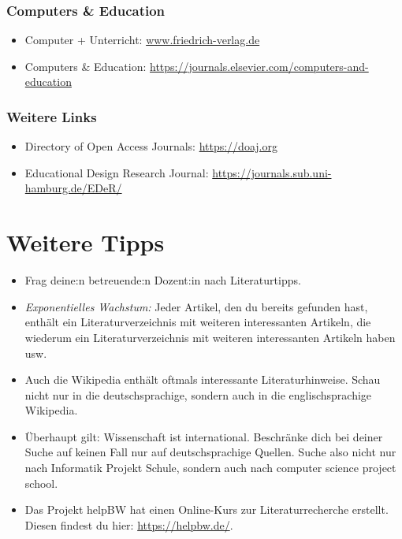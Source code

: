 \documentclass{../cssheet}
\begin{document}
\subsubsection*{Computers \& Education}
\begin{itemize}
\item Computer + Unterricht: \href{https://www.friedrich-verlag.de/shop/schule-und-unterricht/digitale-schule/fachzeitschriften/computer-unterricht}{www.friedrich-verlag.de}
\item Computers \& Education: \url{https://journals.elsevier.com/computers-and-education}
\end{itemize}

\subsubsection*{Weitere Links}
\begin{itemize}
\item Directory of Open Access Journals: \url{https://doaj.org}
\item Educational Design Research Journal: \url{https://journals.sub.uni-hamburg.de/EDeR/}
\end{itemize}

\section{Weitere Tipps}
\begin{itemize}
\item Frag deine:n betreuende:n Dozent:in nach Literaturtipps.
\item \emph{Exponentielles Wachstum:} Jeder Artikel, den du bereits gefunden hast, enthält ein Literaturverzeichnis mit weiteren interessanten Artikeln, die wiederum ein Literaturverzeichnis mit weiteren interessanten Artikeln haben usw.
\item Auch die Wikipedia enthält oftmals interessante Literaturhinweise. Schau nicht nur in die deutschsprachige, sondern auch in die englischsprachige Wikipedia.
\item Überhaupt gilt: Wissenschaft ist international. Beschränke dich bei deiner Suche auf keinen Fall nur auf deutschsprachige Quellen. Suche also nicht nur nach \glqq{}Informatik Projekt Schule\grqq{}, sondern auch nach \glqq{}computer science project school\grqq{}.
\item Das Projekt helpBW hat einen Online-Kurs zur Literaturrecherche erstellt. Diesen findest du hier: \url{https://helpbw.de/}.

\end{itemize}

\newpage

\printlicense

\printsocials
\end{document}
